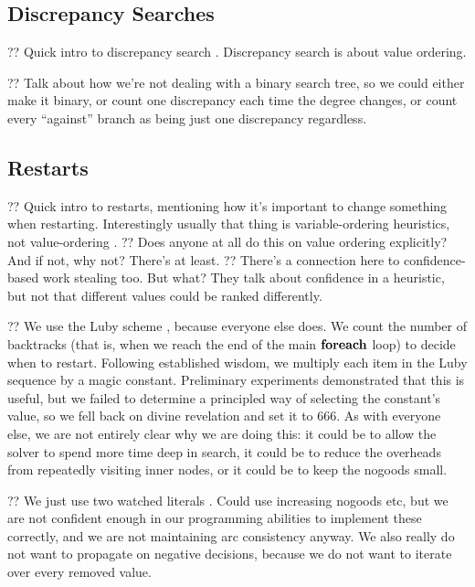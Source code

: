 \documentclass{article}
\newcommand{\citet}[1]{\citeauthor{#1} \shortcite{#1}}
\newcommand{\citep}[1]{\cite{#1}}
\begin{document}
\subsection{Discrepancy Searches}

?? Quick intro to discrepancy search
\citep{DBLP:conf/ijcai/HarveyG95,DBLP:conf/aaai/Korf96,DBLP:conf/ijcai/Walsh97,DBLP:conf/cpaior/KarouiHLN07,DBLP:journals/jea/ProsserU11}.
Discrepancy search is about value ordering.

?? Talk about how we're not dealing with a binary search tree, so we could either make it binary, or
count one discrepancy each time the degree changes, or count every ``against'' branch as being just
one discrepancy regardless.

\subsection{Restarts}

?? Quick intro to restarts, mentioning how it's important to change something when restarting.
Interestingly usually that thing is variable-ordering heuristics, not value-ordering
\citep{DBLP:conf/ijcai/LecoutreSTV07,DBLP:journals/jsat/LecoutreSTV07,DBLP:conf/cp/GayHLS15,DBLP:conf/aaai/LeeSZ16,DBLP:conf/cp/GlorianBLLM17}.
?? Does anyone at all do this on value ordering explicitly? And if not, why not? There's
\citet{DBLP:conf/flairs/RazgonOP07} at least. ?? There's a connection here to confidence-based work
stealing \citep{DBLP:conf/cp/ChuSS09} too. But what? They talk about confidence in a heuristic, but
not that different values could be ranked differently.

?? We use the Luby scheme \citep{DBLP:journals/ipl/LubySZ93}, because everyone else does. We count
the number of backtracks (that is, when we reach the end of the main $\KwSty{foreach}$ loop) to
decide when to restart. Following established wisdom, we multiply each item in the Luby sequence by
a magic constant. Preliminary experiments demonstrated that this is useful, but we failed to
determine a principled way of selecting the constant's value, so we fell back on divine revelation
and set it to 666. As with everyone else, we are not entirely clear why we are doing this: it could
be to allow the solver to spend more time deep in search, it could be to reduce the overheads from
repeatedly visiting inner nodes, or it could be to keep the nogoods small.

?? We just use two watched literals \citep{DBLP:conf/dac/MoskewiczMZZM01}. Could use increasing
nogoods \citep{DBLP:conf/aaai/LeeSZ16,DBLP:conf/cp/GlorianBLLM17} etc, but we are not confident enough
in our programming abilities to implement these correctly, and we are not maintaining arc
consistency anyway. We also really do not want to propagate on negative decisions, because we do not
want to iterate over every removed value.
\end{document}
